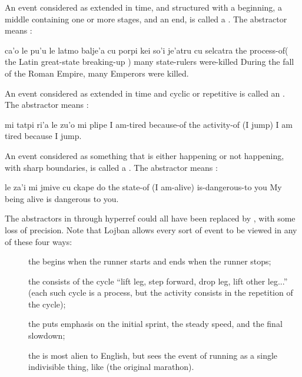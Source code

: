 An event considered as extended in time, and structured with a
    beginning, a middle containing one or more stages, and an end,
    is called a . The abstractor  means
    :
\begin{example}
ca'o le pu'u le latmo balje'a\n
\T	cu porpi kei\n
\T	so'i je'atru cu selcatra\n
{} the process-of( the Latin great-state\n
\T	breaking-up )\n
\T	many state-rulers were-killed\n
During the fall of the Roman Empire,\n
\T	many Emperors were killed.
\end{example}

An event considered as extended in time and cyclic or
    repetitive is called an . The abstractor 
    means :
\begin{example}
mi tatpi ri'a le zu'o mi plipe\n
I am-tired because-of the activity-of (I jump)\n
I am tired because I jump.
\end{example}

An event considered as something that is either happening or
    not happening, with sharp boundaries, is called a .
    The abstractor  means :
\begin{example}
le za'i mi jmive cu ckape do\n
the state-of (I am-alive) is-dangerous-to you\n
My being alive is dangerous to you.
\end{example}

The abstractors in  through
    hyperref could all have been replaced by ,
    with some loss of precision. Note that Lojban allows every sort
    of event to be viewed in any of these four ways: 
\begin{description}
\item[] the  begins when the runner starts and ends when the runner stops;
\item[] the  consists of the cycle ``lift leg, step forward, drop leg, lift other leg...'' (each such cycle is a process, but the activity consists in the repetition of the cycle);
\item[] the  puts emphasis on the initial sprint, the steady speed, and the final slowdown;
\item[] the  is most alien to English, but sees the event of running as a single indivisible thing, like  (the original marathon).
\end{description}

